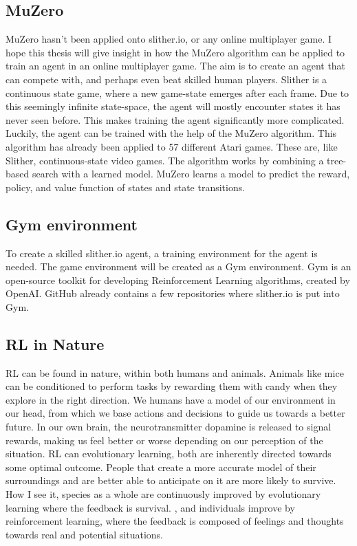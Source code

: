 \subsection{MuZero}
MuZero hasn’t been applied onto slither.io, or any online multiplayer game. I hope this thesis will give insight in how the MuZero algorithm can be applied to train an agent in an online multiplayer game. The aim is to create an agent that can compete with, and perhaps even beat skilled human players. Slither is a continuous state game, where a new game-state emerges after each frame. Due to this seemingly infinite state-space, the agent will mostly encounter states it has never seen before. This makes training the agent significantly more complicated. Luckily, the agent can be trained with the help of the MuZero algorithm. This algorithm has already been applied to 57 different Atari games. These are, like Slither, continuous-state video games. The algorithm works by combining a tree-based search with a learned model. MuZero learns a model to predict the reward, policy, and value function of states and state transitions.



\subsection{Gym environment}
To create a skilled slither.io agent, a training environment for the agent is needed. The game
environment will be created as a Gym environment. Gym is an open-source toolkit for developing
Reinforcement Learning algorithms, created by OpenAI. GitHub already contains a few repositories
where slither.io is put into Gym.

\subsection{RL in Nature}

RL can be found in nature, within both humans and animals. Animals like mice can be conditioned to perform tasks by rewarding them with candy when they explore in the right direction. We humans have a model of our environment in our head, from which we base actions and decisions to guide us towards a better future. In our own brain, the neurotransmitter dopamine is released to signal rewards, making us feel better or worse depending on our perception of the situation. 
RL can evolutionary learning, both are inherently directed towards some optimal outcome. People that create a more accurate model of their surroundings and are better able to anticipate on it are more likely to survive.  
How I see it, species as a whole are continuously improved by evolutionary learning where the feedback is survival. , and individuals improve by reinforcement learning, where the feedback is composed of feelings and thoughts towards real and potential situations.

